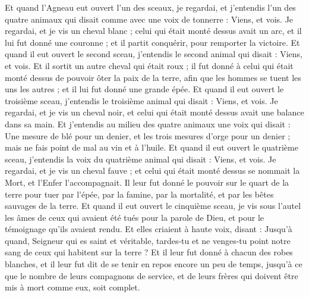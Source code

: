 \begin{multicols}{2}
\VerseOne{}Et quand l'Agneau eut ouvert l'un des sceaux, je regardai, et j'entendis l'un des quatre animaux qui disait comme avec une voix de tonnerre : Viens, et vois.
Je regardai, et je vis un cheval blanc ; celui qui était monté dessus avait un arc, et il lui fut donné une couronne ; et il partit conquérir, pour remporter la victoire{}.
Et quand il eut ouvert le second sceau, j'entendis le second animal qui disait : Viens, et vois.
Et il sortit un autre cheval qui était roux ; il fut donné à celui qui était monté dessus de pouvoir ôter la paix de la terre, afin que les hommes se tuent les uns les autres ; et il lui fut donné une grande épée.
Et quand il eut ouvert le troisième sceau, j'entendis le troisième animal qui disait : Viens, et vois. Je regardai, et je vis un cheval noir, et celui qui était monté dessus avait une balance dans sa main.
Et j'entendis au milieu des quatre animaux une voix qui disait : Une mesure de blé pour un denier, et les trois mesures d'orge pour un denier ; mais ne fais point de mal au vin et à l'huile.
Et quand il eut ouvert le quatrième sceau, j'entendis la voix du quatrième animal qui disait : Viens, et vois.
Je regardai, et je vis un cheval fauve ; et celui qui était monté dessus se nommait la Mort, et l'Enfer l’accompagnait. Il leur fut donné le pouvoir sur le quart de la terre pour tuer par l'épée, par la famine, par la mortalité, et par les bêtes sauvages de la terre.
Et quand il eut ouvert le cinquième sceau, je vis sous l'autel les âmes de ceux qui avaient été tués pour la parole de Dieu, et pour le témoignage qu'ils avaient rendu.
Et elles criaient à haute voix, disant : Jusqu'à quand, Seigneur qui es saint et véritable, tardes-tu et ne venges-tu point notre sang de ceux qui habitent sur la terre ?
Et il leur fut donné à chacun des robes blanches, et il leur fut dit de se tenir en repos encore un peu de temps, jusqu'à ce que le nombre de leurs compagnons de service, et de leurs frères qui doivent être mis à mort comme eux, soit complet.

\end{multicols}
